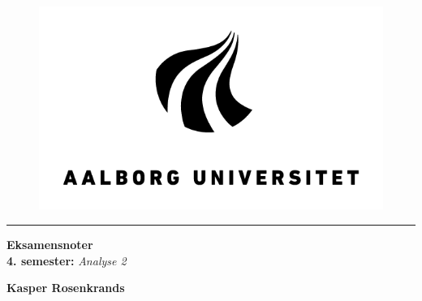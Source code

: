 \begin{center}
\thispagestyle{empty}
\parskip=14pt%
\vspace*{3\parskip}%

\begin{figure}[h]
\centering
    \includegraphics[scale=2]{Figures/AAU_logo/AAU_LOGO_RGB.png}
\end{figure}

\vspace{-8pt}
\rule{16cm}{1pt}
\vspace{5pt}

\Huge{\textbf{Eksamensnoter}}\\
\vspace{8pt}
\Large{\textbf{4. semester:} \textit{Analyse 2}}\\
\vspace{50pt}

\Large{\textbf{Kasper Rosenkrands}}
\end{center}

\newpage
